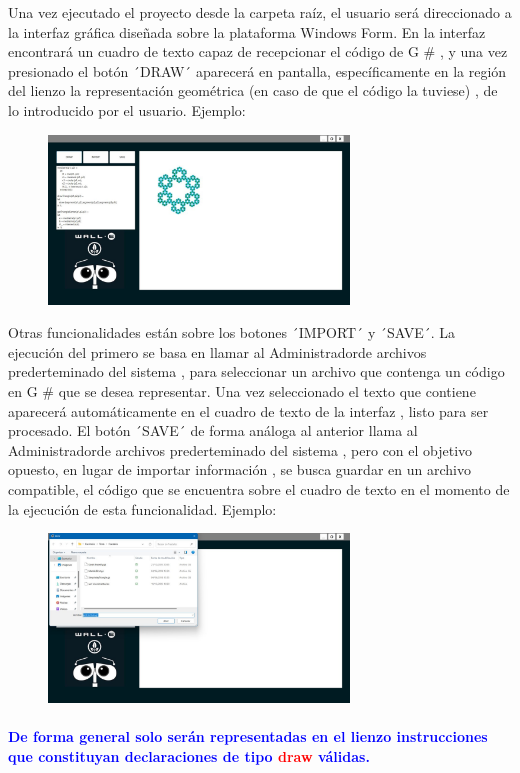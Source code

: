 \documentclass[a4paper, 12pt]{article}
\begin{document}
Una vez ejecutado el proyecto desde la carpeta raíz, el usuario será direccionado a la interfaz gráfica diseñada sobre la plataforma Windows Form. En la interfaz encontrará un cuadro de texto capaz de recepcionar el código de G \# , y una vez presionado el botón ´DRAW´  aparecerá en pantalla, específicamente en la región del lienzo la representación geométrica (en caso de que el código la tuviese) , de lo introducido por el usuario.
Ejemplo:
\begin{figure}[h]
       \center
       \includegraphics[width=8cm]{nieve.jpg}
\end{figure}

Otras funcionalidades están sobre los botones ´IMPORT´ y ´SAVE´.
 La ejecución del primero se basa en llamar al Administradorde archivos prederteminado del sistema , para seleccionar un archivo que contenga un código en G \# que se desea representar. Una vez seleccionado el texto que contiene aparecerá automáticamente en el cuadro de texto de la interfaz , listo para ser procesado.
El botón ´SAVE´ de forma análoga al anterior llama al  Administradorde archivos prederteminado del sistema , pero con el objetivo opuesto, en lugar de importar información , se busca guardar en un archivo compatible, el código que se encuentra sobre el cuadro de texto en el momento de la ejecución de esta funcionalidad.
 Ejemplo:
\begin{figure}[h]
       \center
       \includegraphics[width=8cm]{import.jpg}
\end{figure}

   


\paragraph{\textcolor{blue}{De forma general solo serán representadas en el lienzo instrucciones que constituyan declaraciones de tipo \textcolor{red}{draw}  válidas.}}
\end{document}
